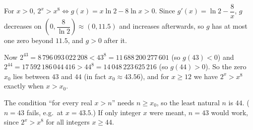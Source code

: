 For $x>0$, $2^x>x^8\iff g(x)=x\ln2-8\ln x>0$. Since $g'(x)=\ln2-\dfrac{8}{x}$, $g$ decreases on $\left(0,\dfrac{8}{\ln2}\right)\approx(0,11.5)$ and increases afterwards, so $g$ has at most one zero beyond $11.5$, and $g>0$ after it.

Now $2^{43}=8\,796\,093\,022\,208<43^8=11\,688\,200\,277\,601$ (so $g(43)<0$) and $2^{44}=17\,592\,186\,044\,416>44^8=14\,048\,223\,625\,216$ (so $g(44)>0$). So the zero $x_0$ lies between $43$ and $44$ (in fact $x_0\approx43.56$), and for $x\ge12$ we have $2^x>x^8$ exactly when $x>x_0$.

The condition ``for every real $x>n$'' needs $n\ge x_0$, so the least natural $n$ is $\boxed{44}$. ($n=43$ fails, e.g.\ at $x=43.5$.) If only integer $x$ were meant, $n=43$ would work, since $2^{x}>x^8$ for all integers $x\ge44$.
